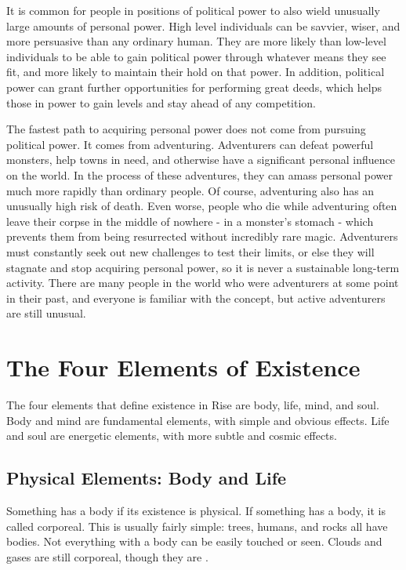   It is common for people in positions of political power to also wield unusually large amounts of personal power.
  High level individuals can be savvier, wiser, and more persuasive than any ordinary human.
  They are more likely than low-level individuals to be able to gain political power through whatever means they see fit, and more likely to maintain their hold on that power.
  In addition, political power can grant further opportunities for performing great deeds, which helps those in power to gain levels and stay ahead of any competition.

  The fastest path to acquiring personal power does not come from pursuing political power.
  It comes from adventuring.
  Adventurers can defeat powerful monsters, help towns in need, and otherwise have a significant personal influence on the world.
  In the process of these adventures, they can amass personal power much more rapidly than ordinary people.
  Of course, adventuring also has an unusually high risk of death.
  Even worse, people who die while adventuring often leave their corpse in the middle of nowhere - in a monster's stomach - which prevents them from being resurrected without incredibly rare magic.
  Adventurers must constantly seek out new challenges to test their limits, or else they will stagnate and stop acquiring personal power, so it is never a sustainable long-term activity.
  There are many people in the world who were adventurers at some point in their past, and everyone is familiar with the concept, but active adventurers are still unusual.

\section{The Four Elements of Existence}

  The four elements that define existence in Rise are body, life, mind, and soul.
  Body and mind are fundamental elements, with simple and obvious effects.
  Life and soul are energetic elements, with more subtle and cosmic effects.

  \subsection{Physical Elements: Body and Life}
    Something has a body if its existence is physical.
    If something has a body, it is called corporeal.
    This is usually fairly simple: trees, humans, and rocks all have bodies.
    Not everything with a body can be easily touched or seen.
    Clouds and gases are still corporeal, though they are .

